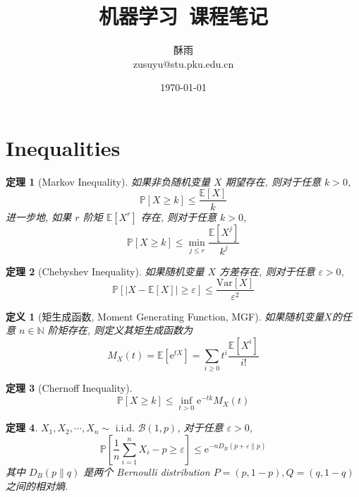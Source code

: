 \documentclass[8pt]{article}
\title{\heiti\zihao{1} 机器学习\ 课程笔记}
\author{\kaishu\zihao{-3} 酥雨\\zusuyu@stu.pku.edu.cn}
\date{\today}
\theoremstyle{compact}
\newtheorem{theorem}{定理}[section]
\newtheorem{definition}{定义}[section]
\def\le{\leqslant}
\def\ge{\geqslant}
\def\P#1{\mathbb{P}\left[{#1}\right]}
\def\E#1{\mathbb{E}\left[{#1}\right]}
\def\Var#1{\text{Var}\left[{#1}\right]}
\def\e{\mathrm{e}}
\begin{document}
\pagestyle{plain}

\maketitle
\tableofcontents
\newpage

\section{Inequalities}
\begin{theorem}[Markov Inequality]
	如果非负随机变量 $X$ 期望存在, 则对于任意 $k > 0$,  $$\P{X \ge k} \le \frac{\E{X}}{k}$$
	进一步地, 如果 $r$ 阶矩 $\E{X^r}$ 存在, 则对于任意 $k > 0$, $$\P{X \ge k} \le \min_{j \le r}\frac{\E{X^j}}{k^j}$$
\end{theorem}
\begin{theorem}[Chebyshev Inequality]
	如果随机变量 $X$ 方差存在, 则对于任意 $\varepsilon > 0$, $$\P{|X - \E{X}| \ge \varepsilon} \le \frac{\Var{X}}{\varepsilon^2}$$
\end{theorem}
\begin{definition}[矩生成函数, Moment Generating Function, MGF]
	如果随机变量$X$的任意 $n \in \mathbb N$ 阶矩存在, 则定义其矩生成函数为 $$M_X(t) = \E{\e^{tX}} = \sum_{i \ge 0}t^i\frac{\E{X^i}}{i!}$$
\end{definition}
\begin{theorem}[Chernoff Inequality]
	$$\P{X \ge k} \le \inf_{t > 0}\e^{-tk}M_X(t)$$
\end{theorem}
\begin{theorem}
	$X_1, X_2, \cdots, X_n \sim \text{ i.i.d. } \mathcal B(1, p)$, 对于任意 $\varepsilon > 0$, $$\P{\frac1n\sum_{i=1}^nX_i - p \ge \varepsilon} \le \e^{-nD_B(p + \varepsilon \| p)}$$
	其中 $D_B(p \| q)$ 是两个 Bernoulli distribution $P = (p, 1 - p), Q = (q, 1 - q)$ 之间的相对熵.
	\label{chernoff-bound-1}
\end{theorem}
\end{document}
